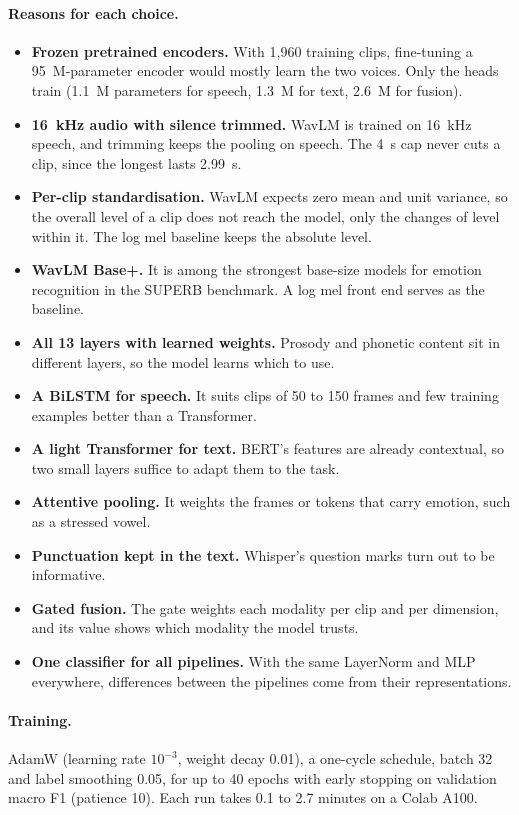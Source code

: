 \documentclass[11pt,a4paper]{article}
\begin{document}
\paragraph{Reasons for each choice.}
\begin{itemize}
\item \textbf{Frozen pretrained encoders.} With 1{,}960 training clips, fine-tuning a 95~M-parameter encoder would
  mostly learn the two voices. Only the heads train (1.1~M parameters for speech, 1.3~M for text, 2.6~M for fusion).
\item \textbf{16~kHz audio with silence trimmed.} WavLM is trained on 16~kHz speech, and trimming keeps the pooling on
  speech. The 4~s cap never cuts a clip, since the longest lasts 2.99~s.
\item \textbf{Per-clip standardisation.} WavLM expects zero mean and unit variance, so the overall level of a clip does
  not reach the model, only the changes of level within it. The log mel baseline keeps the absolute level.
\item \textbf{WavLM Base+.} It is among the strongest base-size models for emotion recognition in the SUPERB benchmark.
  A log mel front end serves as the baseline.
\item \textbf{All 13 layers with learned weights.} Prosody and phonetic content sit in different layers, so the model
  learns which to use.
\item \textbf{A BiLSTM for speech.} It suits clips of 50 to 150 frames and few training examples better than a
  Transformer.
\item \textbf{A light Transformer for text.} BERT's features are already contextual, so two small layers suffice to
  adapt them to the task.
\item \textbf{Attentive pooling.} It weights the frames or tokens that carry emotion, such as a stressed vowel.
\item \textbf{Punctuation kept in the text.} Whisper's question marks turn out to be informative.
\item \textbf{Gated fusion.} The gate weights each modality per clip and per dimension, and its value shows which
  modality the model trusts.
\item \textbf{One classifier for all pipelines.} With the same LayerNorm and MLP everywhere, differences between the
  pipelines come from their representations.
\end{itemize}

\paragraph{Training.} AdamW (learning rate $10^{-3}$, weight decay 0.01), a one-cycle schedule, batch 32 and label
smoothing 0.05, for up to 40 epochs with early stopping on validation macro F1 (patience 10). Each run takes 0.1 to
2.7 minutes on a Colab A100.
\end{document}
